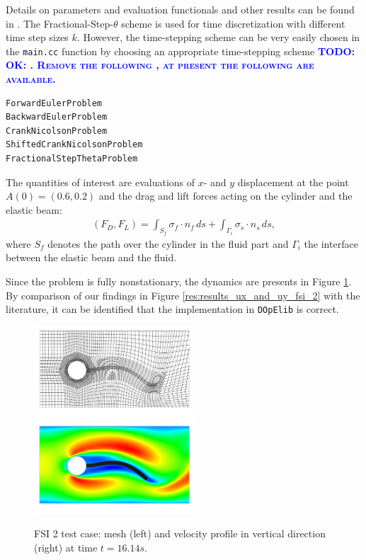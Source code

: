 \documentclass[prodmode,acmtoms]{acmsmall}
\numberwithin{equation}{section}
\newcommand{\dope}{\texttt{DOpElib}}
\newcommand{\todo}[1]{\textbf{\textsc{\textcolor{blue}{TODO: #1}}}}
\begin{document}
Details 
on parameters and evaluation functionals and other results 
can be found in \cite{HrTu06b,BuSc06,DeHaeAnnBrVie10,Wi11}. 
The Fractional-Step-$\theta$ scheme is used for time discretization with
different time step sizes $k$. However, the time-stepping scheme can be 
very easily chosen in the \texttt{main.cc} function by choosing an appropriate 
time-stepping scheme
\todo{OK: . Remove the following
, at present the following are available.}
\begin{lstlisting}
ForwardEulerProblem
BackwardEulerProblem
CrankNicolsonProblem
ShiftedCrankNicolsonProblem
FractionalStepThetaProblem
\end{lstlisting}


The quantities of interest are evaluations of 
$x$- and $y$ displacement at the point $A(0) = (0.6,0.2)$
and the drag and lift forces acting on the cylinder and the elastic beam:
\begin{align}
\label{drag_lift_forces}
(F_D , F_L) 
= {\int_{S_f} \sigma_f \cdot n_f \, ds + 
\int_{\Gamma_i} \sigma_s \cdot n_s \, ds},
\end{align}
where $S_{f}$ denotes the path over the cylinder in the fluid part and
$\Gamma_i$ the interface between the elastic beam and the 
fluid.

Since the problem is fully nonstationary, the 
dynamics are presents in Figure \ref{res:fsi_2_mesh_and_x_velo}. 
By comparison of our findings in Figure \ref{res:results_ux_and_uy_fsi_2}
with the literature, it can be identified that 
the implementation in \dope{} is correct.



\begin{figure}[h]
\centering
{\includegraphics[width=6cm]{Pictures/visit_fsi_2_CNn_t_2e-2_global_3_biharmonic_mesh8070_scale.png}}
{\includegraphics[width=6cm]{Pictures/visit_fsi_2_CNn_t_2e-2_global_3_biharmonic_x_velo8070_scale.png}}
\caption{FSI 2 test case: mesh (left) and velocity profile in vertical 
direction (right) at time $t=16.14s$.}
\label{res:fsi_2_mesh_and_x_velo}
\end{figure}
\end{document}
